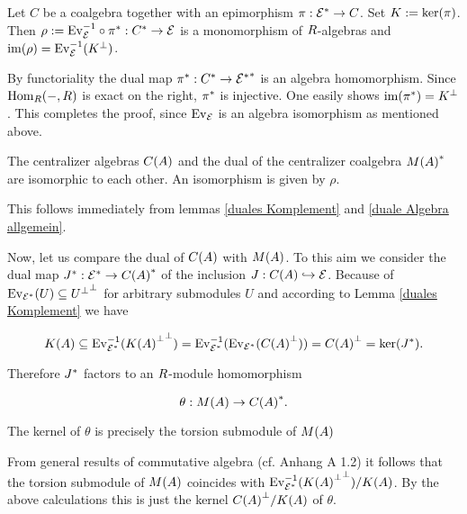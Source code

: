 \documentclass[twoside,12pt]{article}
\begin{document}
\begin{lem} \label{duale Algebra allgemein}
Let $C$ be a coalgebra together with an epimorphism 
$\pi:{{\cal E}}^*\rightarrow C$. Set $K:={\rm ker}(\pi)$.
Then $\rho:={\rm Ev}_{{\cal E}}^{-1}\circ {\pi}^*:{C}^*\rightarrow {\cal E}$ is a
monomorphism
of $R$-algebras and ${\rm im}(\rho)={\rm Ev}_{{\cal E}}^{-1}({K}^{\bot})$.
\end{lem}

\begin{Pf}
By functoriality the dual map
${\pi}^*:{C}^* \rightarrow {{{\cal E}}^*}^*$ is an
algebra homomorphism.
Since ${\rm Hom}_{R}{(-,R)}$ is exact on the right, ${\pi}^*$ is injective.
One easily shows ${\rm im}({\pi}^*)={ K}^{\bot}$. This completes the
proof, since ${\rm Ev}_{{\cal E}}$ is an algebra isomorphism as mentioned above.
\end{Pf}

\begin{thm} \label{duale Algebra}
The centralizer algebras $C(A)$ and the dual of the centralizer coalgebra
${M(A)}^*$ are isomorphic to each other. An isomorphism
is given by $\rho$.
\end{thm}

\begin{Pf}
This follows immediately from lemmas
\ref{duales Komplement} and \ref{duale Algebra allgemein}.
\end{Pf}


Now, let us compare the dual of $C(A)$ with $M(A)$. To this aim we
consider the dual map ${J}^*:{{\cal E}}^* \rightarrow {C(A)}^*$ of the inclusion
$J:C(A) \hookrightarrow {\cal E}$.
Because of ${\rm Ev}_{{{\cal E}}^*}(U)\subseteq {{U}^{\bot}}^{\bot}$ for arbitrary
submodules $U$ and according to Lemma
\ref{duales Komplement} we have

\[K(A) \subseteq{\rm Ev}_{{{\cal E}}^*}^{-1}({{K(A)}^{\bot}}^{\bot})=
{\rm Ev}_{{{\cal E}}^*}^{-1}({\rm Ev}_{{{\cal E}}^*}({C(A)}^{\bot}))= {C(A)}^{\bot}
={\rm ker}({J}^*). \]

Therefore ${J}^*$ factors to an $R$-module homomorphism

\[ \theta :M(A) \rightarrow {C(A)}^*. \]

\begin{lem}\label{Kern theta}
The kernel of $\theta$ is precisely the torsion submodule of $M(A)$
\end{lem}

\begin{Pf}
From general results of commutative algebra (cf. \cite{doc} Anhang A 1.2) it follows
that the torsion submodule of $M(A)$ coincides with
${\rm Ev}_{{{\cal E}}^*}^{-1}({{K(A)}^{\bot}}^{\bot})/K(A)$.
By the above calculations this is just the kernel
${C(A)}^{\bot}/K(A)$ of $\theta$.
\end{Pf}
\end{document}
